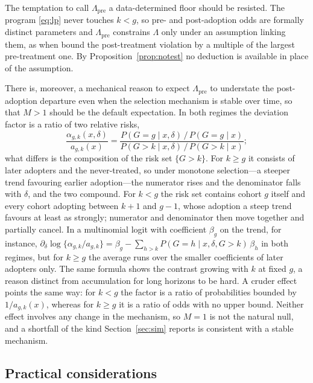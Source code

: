 \documentclass[12pt]{article}
\theoremstyle{remark}
\begin{document}
The temptation to call $\Lambda_{\mathrm{pre}}$ a data-determined floor should be resisted.
The program \eqref{eq:lp} never touches $k < g$, so pre- and post-adoption odds are
formally distinct parameters and $\Lambda_{\mathrm{pre}}$ constrains $\Lambda$ only under
an assumption linking them, as when \citet{rambachan2023honest} bound the post-treatment
violation by a multiple of the largest pre-treatment one. By
Proposition~\ref{prop:notest} no deduction is available in place of the assumption.

There is, moreover, a mechanical reason to expect $\Lambda_{\mathrm{pre}}$ to understate
the post-adoption departure even when the selection mechanism is stable over time, so that
$M > 1$ should be the default expectation. In both regimes the deviation factor is a ratio
of two relative risks,
\[
\frac{\alpha_{g,k}(x,\delta)}{a_{g,k}(x)}
= \frac{P(G{=}g \mid x,\delta)\,/\,P(G{=}g \mid x)}
       {P(G{>}k \mid x,\delta)\,/\,P(G{>}k \mid x)};
\]
what differs is the composition of the risk set $\{G > k\}$. For $k \ge g$ it consists of
later adopters and the never-treated, so under monotone selection---a steeper trend
favouring earlier adoption---the numerator rises and the denominator falls with $\delta$,
and the two compound. For $k < g$ the risk set contains cohort $g$ itself and every cohort
adopting between $k+1$ and $g-1$, whose adoption a steep trend favours at least as
strongly; numerator and denominator then move together and partially cancel. In a
multinomial logit with coefficient $\beta_g$ on the trend, for instance,
$\partial_\delta \log\{\alpha_{g,k}/a_{g,k}\} = \beta_g - \sum_{h > k}
P(G{=}h \mid x, \delta, G{>}k)\,\beta_h$ in both regimes, but for $k \ge g$ the average
runs over the smaller coefficients of later adopters only. The same formula shows the
contrast growing with $k$ at fixed $g$, a reason distinct from accumulation for long
horizons to be hard. A cruder effect points the same way: for $k < g$ the factor is a ratio
of probabilities bounded by $1/a_{g,k}(x)$, whereas for $k \ge g$ it is a ratio of odds
with no upper bound. Neither effect involves any change in the mechanism, so $M = 1$ is not
the natural null, and a shortfall of the kind Section~\ref{sec:sim} reports is consistent
with a stable mechanism.

\subsection{Practical considerations}
\label{sec:practical}
\end{document}
